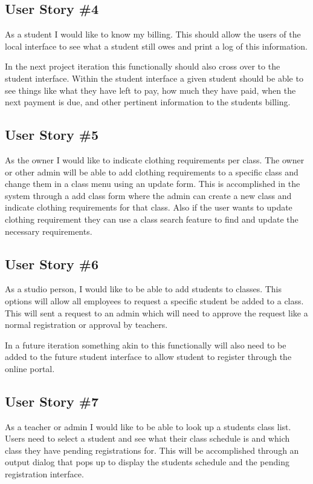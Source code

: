 \subsection{User Story \#4}
As a student I would like to know my billing. This should allow the users of the local interface to see what a student still owes and print a log of this information.

In the next project iteration this functionally should also cross over to the student interface. Within the student interface a given student should be able to see things like what they have left to pay, how much they have paid, when the next payment is due, and other pertinent information to the students billing.

\subsection{User Story \#5}
As the owner I would like to indicate clothing requirements per class. The owner or other admin will be able to add clothing requirements to a specific class and change them in a class menu using an update form. This is accomplished in the system through a add class form where the admin can create a new class and indicate clothing requirements for that class. Also if the user wants to update clothing requirement they can use a class search feature to find and update the necessary requirements.


\subsection{User Story \#6}
As a studio person, I would like to be able to add students to classes. This options will allow all employees to request a specific student be added to a class. This will sent a request to an admin which will need to approve the request like a normal registration or approval by teachers.

In a future iteration something akin to this functionally will also need to be added to the future student interface to allow student to register through the online portal.

\subsection{User Story \#7}
As a teacher or admin I would like to be able to look up a students class list. Users need to select a student and see what their class schedule is and which class they have pending registrations for. This will be accomplished through an output dialog that pops up to display the students schedule and the pending registration interface.


